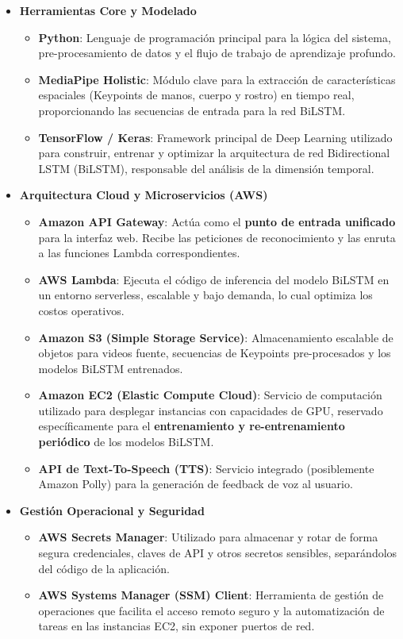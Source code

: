 \begin{itemize}[nosep, itemsep=0.7pt]
    \item \textbf{Herramientas Core y Modelado}
    \begin{itemize}[nosep, itemsep=0pt]
        \item \textbf{Python}: Lenguaje de programación principal para la lógica del sistema, pre-procesamiento de datos y el flujo de trabajo de aprendizaje profundo.
        \item \textbf{MediaPipe Holistic}: Módulo clave para la extracción de características espaciales (Keypoints de manos, cuerpo y rostro) en tiempo real, proporcionando las secuencias de entrada para la red BiLSTM.
        \item \textbf{TensorFlow / Keras}: Framework principal de Deep Learning utilizado para construir, entrenar y optimizar la arquitectura de red Bidirectional LSTM (BiLSTM), responsable del análisis de la dimensión temporal.
    \end{itemize}

    \item \textbf{Arquitectura Cloud y Microservicios (AWS)}
    \begin{itemize}[nosep, itemsep=0pt]
        \item \textbf{Amazon API Gateway}: Actúa como el \textbf{punto de entrada unificado} para la interfaz web. Recibe las peticiones de reconocimiento y las enruta a las funciones Lambda correspondientes.
        \item \textbf{AWS Lambda}: Ejecuta el código de inferencia del modelo BiLSTM en un entorno serverless, escalable y bajo demanda, lo cual optimiza los costos operativos.
        \item \textbf{Amazon S3 (Simple Storage Service)}: Almacenamiento escalable de objetos para videos fuente, secuencias de Keypoints pre-procesados y los modelos BiLSTM entrenados.
        \item \textbf{Amazon EC2 (Elastic Compute Cloud)}: Servicio de computación utilizado para desplegar instancias con capacidades de GPU, reservado específicamente para el \textbf{entrenamiento y re-entrenamiento periódico} de los modelos BiLSTM.
        \item \textbf{API de Text-To-Speech (TTS)}: Servicio integrado (posiblemente Amazon Polly) para la generación de feedback de voz al usuario.
    \end{itemize}

    \item \textbf{Gestión Operacional y Seguridad}
    \begin{itemize}[nosep, itemsep=0pt]
        \item \textbf{AWS Secrets Manager}: Utilizado para almacenar y rotar de forma segura credenciales, claves de API y otros secretos sensibles, separándolos del código de la aplicación.
        \item \textbf{AWS Systems Manager (SSM) Client}: Herramienta de gestión de operaciones que facilita el acceso remoto seguro y la automatización de tareas en las instancias EC2, sin exponer puertos de red.
    \end{itemize}


\end{itemize}
